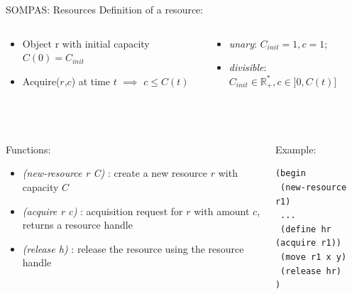\begin{frame}[fragile]{SOMPAS: Resources}
    Definition of a resource:
    \begin{columns}
        \begin{column}{0.5\textwidth}
            \begin{itemize}
                \item Object r with initial capacity $C(0) = C_{init} $
                \item Acquire($r$,$c$) at time $t$ $\implies$ $c \leq C(t)$ 
            \end{itemize}
        \end{column}
        \pause
        \begin{column}{0.5\textwidth}
            \begin{itemize}
                \item \emph{unary}: $C_{init} = 1, c = 1$;
                \item \emph{divisible}: $C_{init} \in  \mathbb{R}_+^*, c \in ]0, C(t)]$
            \end{itemize}
        \end{column}
    \end{columns}
    
    ~~

\pause
    \begin{columns}
        \begin{column}{0.6\textwidth}
            Functions:
            \begin{itemize}
                \item \textit{(new-resource r C)} : create a new resource $r$ with capacity $C$
                \item \emph{(acquire r c)} : acquisition request for $r$ with amount $c$, returns a resource handle
                \item \emph{(release h)} : release the resource using the resource handle
            \end{itemize}
        \end{column}
        \pause
        \begin{column}{0.4\textwidth}
        Example: 
            \small
            \lstset{columns=fullflexible}
            \begin{lstlisting}
(begin
 (new-resource r1)
 ...
 (define hr (acquire r1))
 (move r1 x y)
 (release hr)
)
            \end{lstlisting}
        \end{column}
    \end{columns}


\end{frame}

